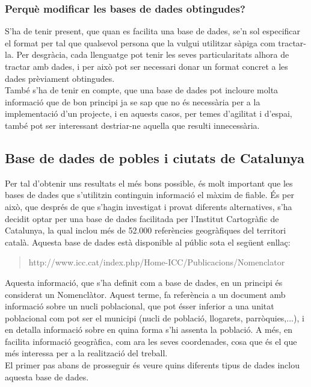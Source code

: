 \documentclass[12pt,a4paper,openright,oneside]{article}
\numberwithin{equation}{section}
\theoremstyle{definition}
\begin{document}
\subsubsection*{Perquè modificar les bases de dades obtingudes?}
S'ha de tenir present, que quan es facilita una base de dades, se'n sol especificar el format per tal que qualsevol persona que la vulgui utilitzar sàpiga com tractar-la. Per desgràcia, cada llenguatge pot tenir les seves particularitats alhora de tractar amb dades, i per això pot ser necessari donar un format concret a les dades prèviament obtingudes. \\També s'ha de tenir en compte, que una base de dades pot incloure molta informació que de bon principi ja se sap que no és necessària per a la implementació d'un projecte, i en aquests casos, per temes d'agilitat i d'espai, també pot ser interessant destriar-ne aquella que resulti innecessària.


\newpage
\subsection*{Base de dades de pobles i ciutats de Catalunya}
Per tal d'obtenir uns resultats el més bons possible, és molt important que les bases de dades que s'utilitzin continguin informació el màxim de fiable. És per això, que després de que s'hagin investigat i provat diferents alternatives, s'ha decidit optar per una base de dades facilitada per l'Institut Cartogràfic de Catalunya, la qual inclou més de 52.000 referències geogràfiques del territori català. Aquesta base de dades està disponible al públic sota el següent enllaç:
\begin{quote}
http://www.icc.cat/index.php/Home-ICC/Publicacions/Nomenclator
\end{quote}
Aquesta informació, que s'ha definit com a base de dades, en un principi és considerat un Nomenclàtor. Aquest terme, fa referència a un document amb informació sobre un nucli poblacional, que pot ésser inferior a una unitat poblacional com pot ser el municipi (nucli de població, llogarets, parròquies,...), i en detalla informació sobre en quina forma s'hi assenta la població. A més, en facilita informació geogràfica, com ara les seves coordenades, cosa que és el que més interessa per a la realització del treball.\\
El primer pas abans de prosseguir és veure quins diferents tipus de dades inclou aquesta base de dades.
\end{document}

